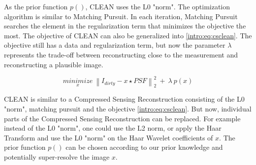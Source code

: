 As the prior function $p()$, CLEAN uses the L0 "norm". The optimization algorithm is similar to Matching Pursuit. In each iteration, Matching Pursuit searches the element in the regularization term that minimizes the objective the most. The objective of CLEAN can also be generalized into \eqref{intro:eq:csclean}. The objective still has a data and regularization term, but now the parameter $\lambda$ represents the trade-off between reconstructing close to the measurement and reconstructing a plausible image.

\begin{equation}\label{intro:eq:csclean}
\underset{x}{minimize} \: \left \| I_{dirty} - x \star PSF \right \|_2^2 \: + \: \lambda \: p(x) 
\end{equation}

CLEAN is similar to a Compressed Sensing Reconstruction consisting of the L0 "norm", matching pursuit and the objective \eqref{intro:eq:csclean}. But now, individual parts of the Compressed Sensing Reconstruction can be replaced. For example instead of the L0 "norm", one could use the L2 norm, or apply the Haar Transform and use the L0 "norm" on the Haar Wavelet coefficients of $x$. The prior function $p()$ can be chosen according to our prior knowledge and potentially super-resolve the image $x$.



